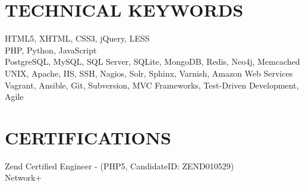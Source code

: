 \documentclass{res}
\begin{document}
\begin{resume}
\section{TECHNICAL KEYWORDS}  

    HTML5, XHTML, CSS3, jQuery, LESS \\
    PHP, Python, JavaScript \\
    PostgreSQL, MySQL, SQL Server, SQLite, MongoDB, Redis, Neo4j, Memcached \\
    UNIX, Apache, IIS, SSH, Nagios, Solr, Sphinx, Varnish, Amazon Web Services \\
    Vagrant, Ansible, Git, Subversion, MVC Frameworks, Test-Driven Development, Agile

 
\section{CERTIFICATIONS}
    Zend Certified Engineer - (PHP5, CandidateID: ZEND010529) \\
    Network+
 
\end{resume}
\end{document}
